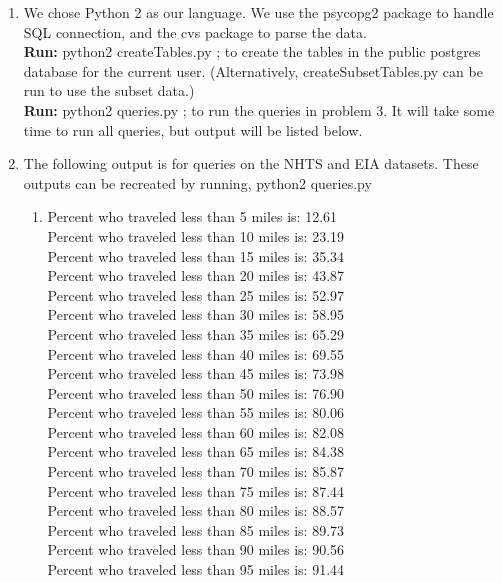 \documentclass[11pt]{article}  %
\begin{document}
\begin{enumerate}
\item We chose Python 2 as our language. We use the psycopg2 package to handle SQL connection, and the cvs package to parse the data.\\
\textbf{Run:} python2 createTables.py ; to create the tables in the public postgres database for the current user. (Alternatively, createSubsetTables.py can be run to use the subset data.)\\
\textbf{Run:} python2 queries.py ; to run the queries in problem 3. It will take some time to run all queries, but output will be listed below. 
\item The following output is for queries on the NHTS and EIA datasets. These outputs can be recreated by running, python2 queries.py
\begin{enumerate}
\item Percent who traveled less than 5 miles is: 12.61\\
Percent who traveled less than 10 miles is: 23.19\\
Percent who traveled less than 15 miles is: 35.34\\
Percent who traveled less than 20 miles is: 43.87\\
Percent who traveled less than 25 miles is: 52.97\\
Percent who traveled less than 30 miles is: 58.95\\
Percent who traveled less than 35 miles is: 65.29\\
Percent who traveled less than 40 miles is: 69.55\\
Percent who traveled less than 45 miles is: 73.98\\
Percent who traveled less than 50 miles is: 76.90\\
Percent who traveled less than 55 miles is: 80.06\\
Percent who traveled less than 60 miles is: 82.08\\
Percent who traveled less than 65 miles is: 84.38\\
Percent who traveled less than 70 miles is: 85.87\\
Percent who traveled less than 75 miles is: 87.44\\
Percent who traveled less than 80 miles is: 88.57\\
Percent who traveled less than 85 miles is: 89.73\\
Percent who traveled less than 90 miles is: 90.56\\
Percent who traveled less than 95 miles is: 91.44\\

\end{enumerate}
\end{enumerate}
\end{document}
